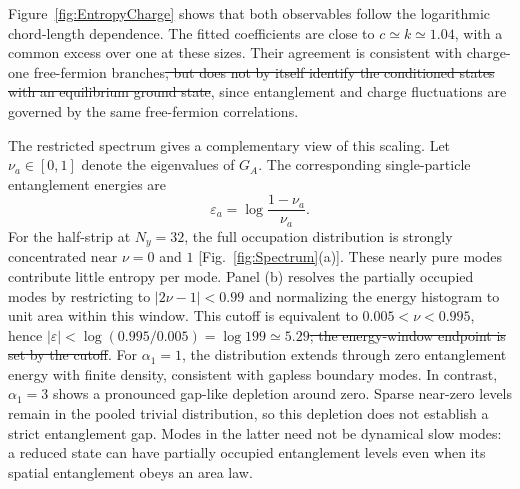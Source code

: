 \documentclass[aps,prb,10pt,twocolumn,superscriptaddress,longbibliography,floatfix]{revtex4-2}
\newcommand{\claudeadd}[1]{{\color{orange}#1}}
\newcommand{\claudedel}[1]{{\color{orange}\sout{#1}}}
\begin{document}
{\color{blue}
Figure~\ref{fig:EntropyCharge} shows that both observables follow the logarithmic chord-length dependence. The fitted coefficients are close to $c\simeq k\simeq1.04$, with a common excess over one at these sizes. Their agreement is consistent with charge-one free-fermion branches\claudedel{, but does not by itself identify the conditioned states with an equilibrium ground state}\claudeadd{, since entanglement and charge fluctuations are governed by the same free-fermion correlations}.

The restricted spectrum gives a complementary view of this scaling. \claudeadd{Let $\nu_a\in[0,1]$ denote the eigenvalues of $G_A$.} The corresponding single-particle entanglement energies are
\begin{equation}
 \varepsilon_a=\log\frac{1-\nu_a}{\nu_a}.
 \label{eq:EntanglementEnergies}
\end{equation}
For the half-strip at $N_y=32$, the full occupation distribution is strongly concentrated near $\nu=0$ and $1$ [Fig.~\ref{fig:Spectrum}(a)]. These nearly pure modes contribute little entropy per mode. Panel (b) resolves the partially occupied modes by restricting to $|2\nu-1|<0.99$ and normalizing the energy histogram to unit area within this window. This cutoff is equivalent to $0.005<\nu<0.995$, hence $|\varepsilon|<\log(0.995/0.005)=\log199\simeq5.29$\claudedel{; the energy-window endpoint is set by the cutoff}. For $\alpha_1=1$, the distribution extends through zero entanglement energy with finite density, consistent with gapless boundary modes. In contrast, $\alpha_1=3$ shows a pronounced gap-like depletion around zero. Sparse near-zero levels remain in the pooled trivial distribution, so this depletion does not establish a strict entanglement gap. Modes in the latter need not be dynamical slow modes: a reduced state can have partially occupied entanglement levels even when its spatial entanglement obeys an area law.

}
\end{document}
